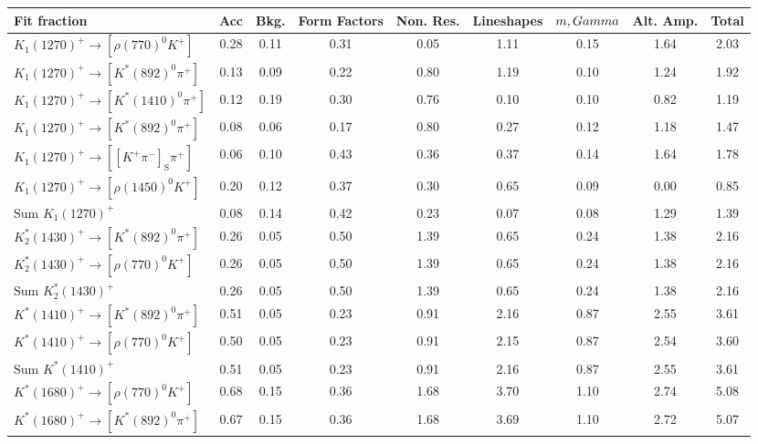 \begin{tabular}{l  c  c  c  c  c  c  c  | c }
\hline
\hline
Fit fraction & Acc & Bkg. & Form Factors & Non. Res. & Lineshapes & $m,\\Gamma$ & Alt. Amp. &  Total  \\ 
\hline
$K_{1}(1270)^{+}\rightarrow \left[\rho(770)^{0}K^{+}\right]$ & 0.28 & 0.11 & 0.31 & 0.05 & 1.11 & 0.15 & 1.64 & 2.03 \\ 
$K_{1}(1270)^{+}\rightarrow \left[K^{*}(892)^{0}\pi^{+}\right]$ & 0.13 & 0.09 & 0.22 & 0.80 & 1.19 & 0.10 & 1.24 & 1.92 \\ 
$K_{1}(1270)^{+}\rightarrow \left[K^{*}(1410)^{0}\pi^{+}\right]$ & 0.12 & 0.19 & 0.30 & 0.76 & 0.10 & 0.10 & 0.82 & 1.19 \\ 
$K_{1}(1270)^{+}\rightarrow \left[K^{*}(892)^{0}\pi^{+}\right]$ & 0.08 & 0.06 & 0.17 & 0.80 & 0.27 & 0.12 & 1.18 & 1.47 \\ 
$K_{1}(1270)^{+}\rightarrow \left[\left[K^{+}\pi^{-}\right]_{\text{S}}\pi^{+}\right]$ & 0.06 & 0.10 & 0.43 & 0.36 & 0.37 & 0.14 & 1.64 & 1.78 \\ 
$K_{1}(1270)^{+}\rightarrow \left[\rho(1450)^{0}K^{+}\right]$ & 0.20 & 0.12 & 0.37 & 0.30 & 0.65 & 0.09 & 0.00 & 0.85 \\ 
$\text{Sum } K_{1}(1270)^{+}$ & 0.08 & 0.14 & 0.42 & 0.23 & 0.07 & 0.08 & 1.29 & 1.39 \\ 
$K_{2}^{*}(1430)^{+}\rightarrow \left[K^{*}(892)^{0}\pi^{+}\right]$ & 0.26 & 0.05 & 0.50 & 1.39 & 0.65 & 0.24 & 1.38 & 2.16 \\ 
$K_{2}^{*}(1430)^{+}\rightarrow \left[\rho(770)^{0}K^{+}\right]$ & 0.26 & 0.05 & 0.50 & 1.39 & 0.65 & 0.24 & 1.38 & 2.16 \\ 
$\text{Sum } K_{2}^{*}(1430)^{+}$ & 0.26 & 0.05 & 0.50 & 1.39 & 0.65 & 0.24 & 1.38 & 2.16 \\ 
$K^{*}(1410)^{+}\rightarrow \left[K^{*}(892)^{0}\pi^{+}\right]$ & 0.51 & 0.05 & 0.23 & 0.91 & 2.16 & 0.87 & 2.55 & 3.61 \\ 
$K^{*}(1410)^{+}\rightarrow \left[\rho(770)^{0}K^{+}\right]$ & 0.50 & 0.05 & 0.23 & 0.91 & 2.15 & 0.87 & 2.54 & 3.60 \\ 
$\text{Sum } K^{*}(1410)^{+}$ & 0.51 & 0.05 & 0.23 & 0.91 & 2.16 & 0.87 & 2.55 & 3.61 \\ 
$K^{*}(1680)^{+}\rightarrow \left[\rho(770)^{0}K^{+}\right]$ & 0.68 & 0.15 & 0.36 & 1.68 & 3.70 & 1.10 & 2.74 & 5.08 \\ 
$K^{*}(1680)^{+}\rightarrow \left[K^{*}(892)^{0}\pi^{+}\right]$ & 0.67 & 0.15 & 0.36 & 1.68 & 3.69 & 1.10 & 2.72 & 5.07 \\ 

\end{tabular}
